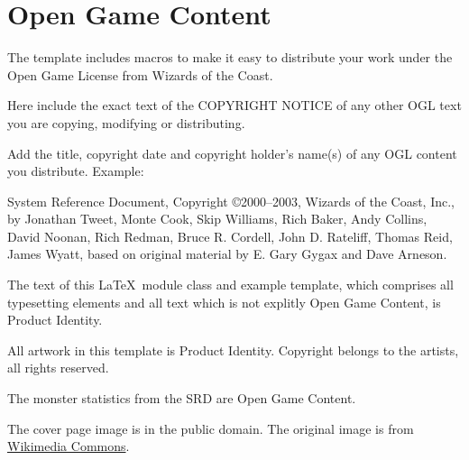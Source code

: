 \documentclass[a4paper,serif]{module}       %
\begin{document}
\lipsum

\section{Open Game Content}
\label{ogl}

The template includes macros to make it easy to distribute your work under the Open Game License from Wizards of the Coast.

\begin{ogl}
\item Here include the exact text of the COPYRIGHT NOTICE of any other OGL text you are copying, modifying or distributing.
\item Add the title, copyright date and copyright holder's name(s) of any OGL content you distribute. Example:
\item System Reference Document, Copyright \copyright 2000--2003, Wizards of the Coast, Inc., by Jonathan Tweet, Monte Cook, Skip Williams, Rich Baker, Andy Collins,
David Noonan, Rich Redman, Bruce R. Cordell, John D. Rateliff, Thomas Reid, James Wyatt, based on original material by E. Gary Gygax and Dave Arneson.
\end{ogl}

\begin{productidentity}
\item The text of this \LaTeX~module class and example template, which comprises all typesetting elements and all text which is not explitly Open Game Content, is Product Identity.
\modulecopyright

\item All artwork in this template is Product Identity. Copyright belongs to the artists, all rights reserved.
\end{productidentity}

\begin{opengamecontent}
\item The monster statistics from the SRD are Open Game Content.
\item The cover page image is in the public domain. The original image is from 
\href{https://commons.wikimedia.org/wiki/File:The_Great_Pyramid_and_the_Sphinx.jpg}{Wikimedia Commons}.
\end{opengamecontent}


\tableofcontents

\end{document}
